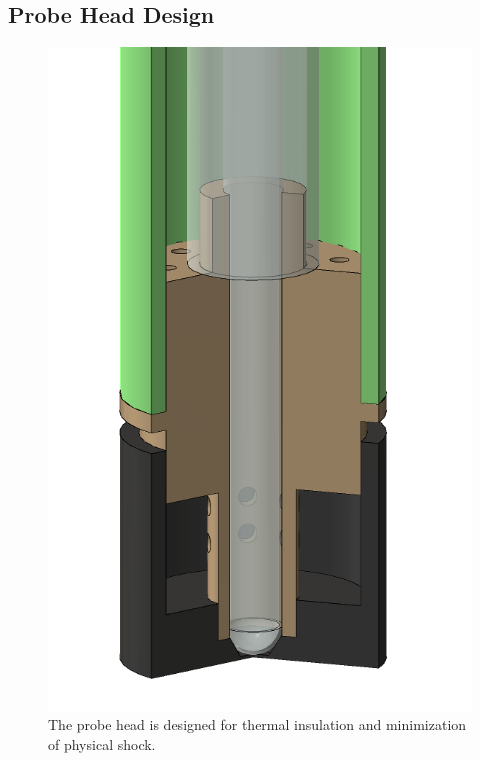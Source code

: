 \documentclass[PaulGanssle-Thesis.tex]{subfiles}
\begin{document}
\subsection{Probe Head Design}
\label{Section:Pneumatic-Shuttling-Probe-Head-Design}
\begin{figure}
\vspace*{-0.75\lineheight}
\includegraphics[width=0.25\tw]{figures/magnetometer/ProbeHeadCloseup.png}
\caption{The probe head is designed for thermal insulation and minimization of physical shock.}
\label{fig:ProbeHeadRender}
\vspace*{-0.5\lineheight}
\end{figure}
\end{document}
